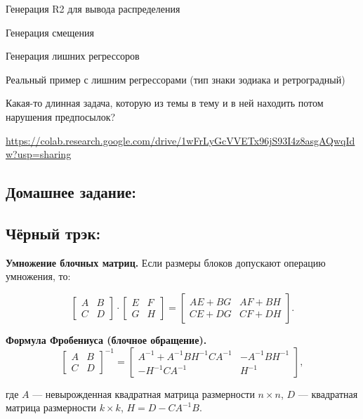 \documentclass[12pt]{article}
\begin{document}
Генерация R2 для вывода распределения

Генерация смещения

Генерация лишних регрессоров

Реальный пример с лишним регрессорами (тип знаки зодиака и ретроградный)

Какая-то длинная задача, которую из темы в тему и в ней находить потом нарушения предпосылок?



\url{https://colab.research.google.com/drive/1wFrLyGcVVETx96jS93I4z8asgAQwqIdw?usp=sharing}


\subsection{Домашнее задание:}


\subsection{Чёрный трэк:}

\textbf{Умножение блочных матриц.} Если размеры блоков допускают операцию умножения, то:

\[
\left[
\begin{array}{c|c}
A & B \\
\hline
C & D
\end{array}
\right]
\cdot
\left[
\begin{array}{c|c}
E & F \\
\hline
G & H
\end{array}
\right]
=
\left[
\begin{array}{c|c}
AE + BG &  AF+BH\\
\hline
CE+DG & CF+DH
\end{array}
\right].
\]

\bigskip

\textbf{Формула Фробениуса (блочное обращение).}
\[
\left[
\begin{array}{c|c}
A & B \\
\hline
C & D
\end{array}
\right]^{-1}=
\left[
\begin{array}{c|c}
A^{-1}+A^{-1}BH^{-1}CA^{-1} & -A^{-1}BH^{-1} \\
\hline
-H^{-1}CA^{-1} & H^{-1}
\end{array}
\right],
\]

где $A$ — невырожденная квадратная матрица размерности $n \times n$, $D$ — квадратная матрица размерности $k \times k$, $H = D - CA^{-1}B$.
\end{document}
